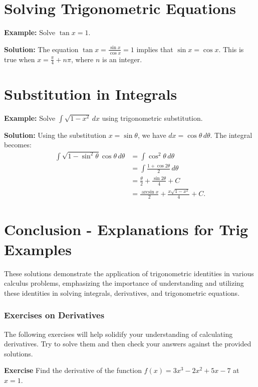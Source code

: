 \documentclass[a4paper,12pt]{book}
\newenvironment{exercise}[1][]
  {\par\medskip\noindent\textbf{Exercise #1} \rmfamily}
  {\medskip}
\newcounter{problem}
\begin{document}
\section{Solving Trigonometric Equations}

\textbf{Example:} Solve $\tan x = 1$.

\textbf{Solution:}
The equation $\tan x = \frac{\sin x}{\cos x} = 1$ implies that $\sin x = \cos x$. This is true when $x = \frac{\pi}{4} + n\pi$, where $n$ is an integer.

\section{Substitution in Integrals}

\textbf{Example:} Solve $\int \sqrt{1 - x^2} \, dx$ using trigonometric substitution.

\textbf{Solution:}
Using the substitution $x = \sin \theta$, we have $dx = \cos \theta \, d\theta$. The integral becomes:
\begin{align*}
\int \sqrt{1 - \sin^2 \theta} \cos \theta \, d\theta &= \int \cos^2 \theta \, d\theta \\
&= \int \frac{1 + \cos 2\theta}{2} \, d\theta \\
&= \frac{\theta}{2} + \frac{\sin 2\theta}{4} + C \\
&= \frac{\arcsin x}{2} + \frac{x \sqrt{1 - x^2}}{4} + C.
\end{align*}

\section*{Conclusion - Explanations for Trig Examples}
These solutions demonstrate the application of trigonometric identities in various calculus problems, emphasizing the importance of understanding and utilizing these identities in solving integrals, derivatives, and trigonometric equations.


\subsubsection*{Exercises on Derivatives}

The following exercises will help solidify your understanding of calculating derivatives. Try to solve them and then check your answers against the provided solutions.

\begin{exercise}
Find the derivative of the function \( f(x) = 3x^3 - 2x^2 + 5x - 7 \) at \( x = 1 \).
\end{exercise}
\end{document}
